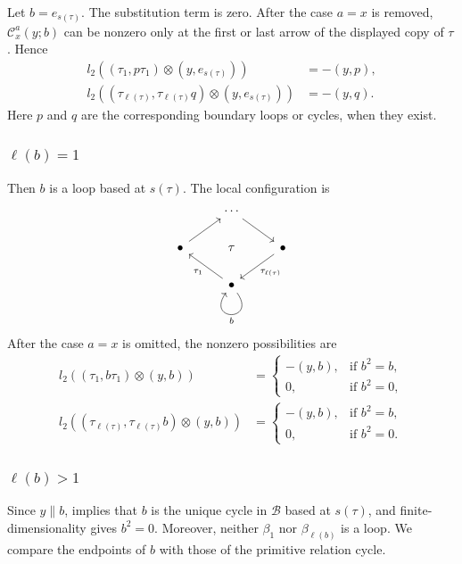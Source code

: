 \documentclass[11pt,a4paper,reqno]{amsart}
\newcommand{\mB}{\mathcal B}
\newcommand{\mC}{\mathcal C}
\newcommand{\para}[2]{(#1,#2)}
\newcommand{\taue}{\tau_{\ell(\tau)}}
\newcommand{\bet}{\beta_{\ell(b)}}
\theoremstyle{plain}
\theoremstyle{definition}
\numberwithin{equation}{section}
\begin{document}
	Let $b=e_{s(\tau)}$.  The substitution term is zero.  After the case
	$a=x$ is removed, $\mC_x^a(y;b)$ can be nonzero only at the first or last
	arrow of the displayed copy of $\tau$.  Hence
	\begin{align}
		l_2(\para{\tau_1}{p\tau_1}\otimes\para{y}{e_{s(\tau)}})
		&=-\para{y}{p},\\
		l_2(\para{\taue}{\taue q}\otimes\para{y}{e_{s(\tau)}})
		&=-\para{y}{q}.
	\end{align}
	Here $p$ and $q$ are the corresponding boundary loops or cycles, when they
	exist.
	
	\subsubsection{$\ell(b)=1$}
	
	Then $b$ is a loop based at $s(\tau)$.  The local configuration is
	\[
	\begin{tikzcd}
		& \cdots & \\
		\bullet & \tau & \bullet \\
		& \bullet
		\arrow[from=1-2, to=2-3]
		\arrow[from=2-1, to=1-2]
		\arrow["\taue", from=2-3, to=3-2]
		\arrow["{\tau_1}", from=3-2, to=2-1]
		\arrow["b", from=3-2, to=3-2, loop, in=235, out=305, distance=10mm]
	\end{tikzcd}
	\]
	After the case $a=x$ is omitted, the nonzero possibilities are
	\begin{align}
		l_2(\para{\tau_1}{b\tau_1}\otimes\para{y}{b})
		&=
		\begin{cases}
			-\para{y}{b}, & \text{if } b^2=b,\\
			0, & \text{if } b^2=0,
		\end{cases}\\
		l_2(\para{\taue}{\taue b}\otimes\para{y}{b})
		&=
		\begin{cases}
			-\para{y}{b},&\text{if }b^2=b,\\
			0,&\text{if }b^2=0.
		\end{cases}
	\end{align}
	\subsubsection{$\ell(b)>1$}
	
	Since $y\parallel b$,  implies that $b$ is the unique
	cycle in $\mB$ based at $s(\tau)$, and finite-dimensionality gives $b^2=0$.
	Moreover, neither $\beta_1$ nor $\bet$ is a loop.  We compare the endpoints of
	$b$ with those of the primitive relation cycle.
	
\end{document}
